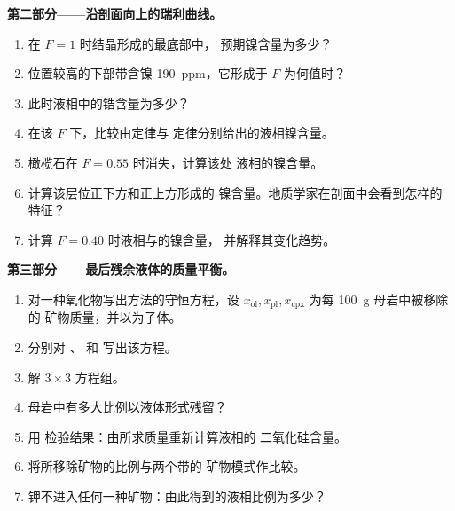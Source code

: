 \begin{problem}
\noindent\textbf{第二部分——沿剖面向上的瑞利曲线。}
\begin{enumerate}[resume]
\item 在 $F = 1$ 时结晶形成的最底部中，
预期镍含量为多少？
\item 位置较高的下部带含镍 \qty{190}{ppm}，它形成于
$F$ 为何值时？
\item 此时液相中的锆含量为多少？
\item 在该 $F$ 下，比较由定律与
定律分别给出的液相镍含量。
\item 橄榄石在 $F = 0.55$ 时消失，计算该处
液相的镍含量。
\item 计算该层位正下方和正上方形成的
镍含量。地质学家在剖面中会看到怎样的特征？
\item 计算 $F = 0.40$ 时液相与的镍含量，
并解释其变化趋势。
\end{enumerate}

\noindent\textbf{第三部分——最后残余液体的质量平衡。}
\begin{enumerate}[resume]
\item 对一种氧化物写出方法的守恒方程，设
$x_{\mathrm{ol}}, x_{\mathrm{pl}}, x_{\mathrm{cpx}}$ 为每 \qty{100}{g} 母岩中被移除的
矿物质量，并以为子体。
\item 分别对 、 和  写出该方程。
\item 解 $3 \times 3$ 方程组。
\item 母岩中有多大比例以液体形式残留？
\item 用  检验结果：由所求质量重新计算液相的
二氧化硅含量。
\item 将所移除矿物的比例与两个带的
矿物模式作比较。
\item 钾不进入任何一种矿物：由此得到的液相比例为多少？
\end{enumerate}


\end{problem}
